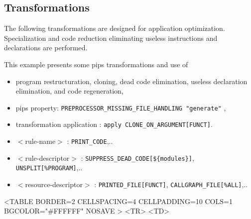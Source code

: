 \documentclass[a4paper,12pt]{article}
\begin{document}
\subsection{Transformations}
\label{exm3}

The following transformations are designed for application optimization.
Specialization and code reduction eliminating useless instructions and
declarations are performed.

This example presents some pips transformations and use of 
\begin{itemize}
\item program restructuration, cloning, dead code elimination, useless
  declaration elimination, and code regeneration, 
\item pips property: \verb+PREPROCESSOR_MISSING_FILE_HANDLING "generate"+ , 
\item transformation application : \verb+apply CLONE_ON_ARGUMENT[FUNCT]+.
\item $<$rule-name$>$ : \verb+PRINT_CODE+,..
\item $<$rule-descriptor$>$ : 
  \verb+SUPPRESS_DEAD_CODE[${modules}]+,  \verb+UNSPLIT[%PROGRAM]+,..
\item $<$resource-descriptor$>$ :  \verb+PRINTED_FILE[FUNCT]+,  \verb+CALLGRAPH_FILE[%ALL]+,..
\end{itemize}
\begin{rawhtml}
<TABLE BORDER=2 CELLSPACING=4 CELLPADDING=10 COLS=1  BGCOLOR="#FFFFFF" NOSAVE >
<TR>
<TD>
\end{rawhtml}
\end{document}
